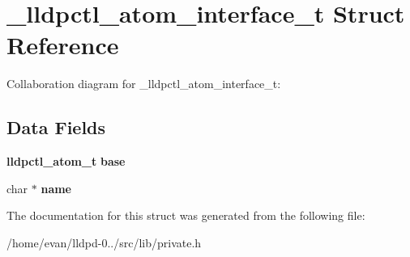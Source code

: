 \section{\-\_\-lldpctl\-\_\-atom\-\_\-interface\-\_\-t \-Struct \-Reference}
\label{struct__lldpctl__atom__interface__t}


\-Collaboration diagram for \-\_\-lldpctl\-\_\-atom\-\_\-interface\-\_\-t\-:
\subsection*{\-Data \-Fields}
\begin{DoxyCompactItemize}
\item 
{\bf lldpctl\-\_\-atom\-\_\-t} {\bfseries base}\label{struct__lldpctl__atom__interface__t_add397d02e5d3c1626944dc981febfa0f}

\item 
char $\ast$ {\bfseries name}\label{struct__lldpctl__atom__interface__t_a5ac083a645d964373f022d03df4849c8}

\end{DoxyCompactItemize}


\-The documentation for this struct was generated from the following file\-:\begin{DoxyCompactItemize}
\item 
/home/evan/lldpd-\/0../src/lib/private.\-h\end{DoxyCompactItemize}
